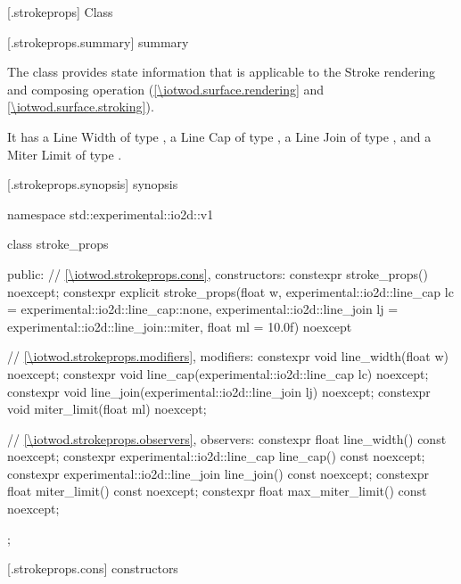 
 [\iotwod.strokeprops] {Class }

 [\iotwod.strokeprops.summary] { summary}

\pnum
The  class provides state information that is applicable to the Stroke rendering and composing operation (\ref{\iotwod.surface.rendering} and \ref{\iotwod.surface.stroking}).

\pnum
It has a Line Width of type , a Line Cap of type , a Line Join of type , and a Miter Limit of type .

%
 [\iotwod.strokeprops.synopsis] { synopsis}

\begin{codeblock}
namespace std::experimental::io2d::v1 {
  class stroke_props {
  public:
    // \ref{\iotwod.strokeprops.cons}, constructors:
    constexpr stroke_props() noexcept;
    constexpr explicit stroke_props(float w,
      experimental::io2d::line_cap lc = experimental::io2d::line_cap::none,
      experimental::io2d::line_join lj = experimental::io2d::line_join::miter,
      float ml = 10.0f) noexcept    

    // \ref{\iotwod.strokeprops.modifiers}, modifiers:
    constexpr void line_width(float w) noexcept;
    constexpr void line_cap(experimental::io2d::line_cap lc) noexcept;
    constexpr void line_join(experimental::io2d::line_join lj) noexcept;
    constexpr void miter_limit(float ml) noexcept;
    
    // \ref{\iotwod.strokeprops.observers}, observers:
    constexpr float line_width() const noexcept;
    constexpr experimental::io2d::line_cap line_cap() const noexcept;
    constexpr experimental::io2d::line_join line_join() const noexcept;
    constexpr float miter_limit() const noexcept;
    constexpr float max_miter_limit() const noexcept;
  };
}
\end{codeblock}

 [\iotwod.strokeprops.cons] { constructors}

